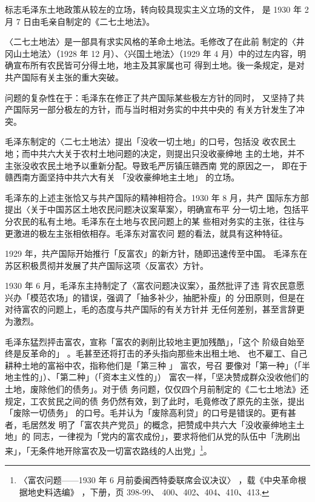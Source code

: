 标志毛泽东土地政策从较左的立场，转向较具现实主义立场的文件，
是 1930 年 2 月 7 日由毛亲自制定的《二七土地法》。
 
〈二七土地法〉是一部具有求实风格的革命土地法。毛修改了在此前
制定的〈井冈山土地法〉（1928 年 12 月）、〈兴国土地法〉（1929 年 4
月）中的过左内容，明确宣布所有农民皆可分得土地，地主及其家属也可
得到土地。後一条规定，是对共产国际有关主张的重大突破。
 
问题的复杂性在于：毛泽东在修正了共产国际某些极左方针的同时，
又坚持了共产国际另一部分极左的方针，而与当时相对务实的中共中央的
有关方针发生了冲突。
 
毛泽东制定的〈二七土地法〉提出「没收一切土地」的口号，包括没
收农民土地；而中共六大关于农村土地问题的决定，则提出只没收豪绅地
主的土地，并不主张没收农民土地予以重新分配。导致毛严厉镇压赣西南
党的原因之一，
即在于赣西南方面坚持中共六大有关
「没收豪绅地主土地」
的立场。
 
毛泽东的上述主张恰又与共产国际的精神相符合。1930 年 8 月，共产
国际东方部提出〈关于中国苏区土地农民问题决议案草案〉，明确宣布平
分一切土地，包括平分农民的私有土地。毛泽东在土地与农民问题上的某
些相对务实的主张，往往与更激进的极左主张相依相存。毛泽东对富农问
题的看法，就具有这种特征。
 
1929 年，共产国际开始推行「反富农」的新方针，随即迅速传至中国。
毛泽东在苏区积极贯彻并发展了共产国际这项〈反富农〉方针。
 
1930 年 6 月，毛泽东主持制定了〈富农问题决议案〉，虽然批评了违
背农民意愿兴办「模范农场」的错误，强调了「抽多补少，抽肥补瘦」的
分田原则，但是在对待富农的问题上，毛的态度与共产国际的有关方针并
无任何差别，甚至言辞更为激烈。

毛泽东猛烈抨击富农，宣称「富农的剥削比较地主更加残酷」，「这个
阶级自始至终是反革命的」 。毛甚至还将打击的矛头指向那些未出租土地、
也不雇工、自己耕种土地的富裕中农，指称他们是「第三种 」 富农，号召
要像对「第一种」（「半地主性的」）、「第二种」（「资本主义性的」）
富农一样，「坚决赞成群众没收他们的土地，废除他们的债务」。对于债
务问题，仅仅四个月前制定的《二七土地法》还规定，工农贫民之间的债
务仍然有效，到了此时，毛竟修改了原先的主张，提出「废除一切债务」
的口号。毛并认为「废除高利贷」的口号是错误的。更有甚者，毛居然发
明了「富农共产党员」的概念，把赞成中共六大「没收豪绅地主土地」的
同志，一律视为「党内的富农成份」，要求将他们从党的队伍中「洗刷出
来」，「无条件地开除富农及一切富农路线的人出党」\footnote{〈富农问题——1930 年 6 月前委闽西特委联席会议决议〉
，载《中央革命根据地史料选编》
，下册，页 398-99、
400、402、404、410、413.}。

